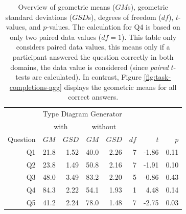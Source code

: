 \documentclass[runningheads]{llncs}
\begin{document}
\begin{itemize}
  \begin{table}[]
    \centering
    \begin{tabular}{rrrrrrrr}
    \toprule
         & \multicolumn{4}{c}{Type Diagram Generator} & & &                                                                   \\
         & \multicolumn{2}{c}{with}                   & \multicolumn{2}{c}{without} &      &       &                     \\
\cmidrule(r){2-3}\cmidrule(r){4-5}
Question & $GM$                                       & $GSD$                       & $GM$ & $GSD$ & $df$ & $t$   & $p$  \\
\midrule
      Q1 & 21.8                                       & 1.52                        & 40.0 & 2.26  & 7    & -1.86 & 0.11 \\
      Q2 & 23.8                                       & 1.49                        & 50.8 & 2.16  & 7    & -1.91 & 0.10 \\
      Q3 & 48.0                                       & 3.49                        & 83.2 & 2.20  & 5    & -0.86 & 0.43 \\
      Q4 & 84.3                                       & 2.22                        & 54.1 & 1.93  & 1    & 4.48  & 0.14 \\
      Q5 & 41.2                                       & 2.24                        & 78.0 & 1.48  & 7    & -2.75 & 0.03 \\
\bottomrule
    \end{tabular}
    \caption{Overview of geometric means ($GM$s), geometric standard deviations ($GSD$s), degrees of freedom ($df$), $t$-values, and $p$-values. The calculation for Q4 is based on only two paired data values ($df = 1$). This table only considers paired data values, this means only if a participant answered the question correctly in both domains, the data value is considered (since \emph{paired} $t$-tests are calculated). In contrast, Figure \ref{fig:task-completions-agg} displays the geometric means for all correct answers.}
    \label{tab:p-values}
  \end{table}


\end{itemize}
\end{document}
